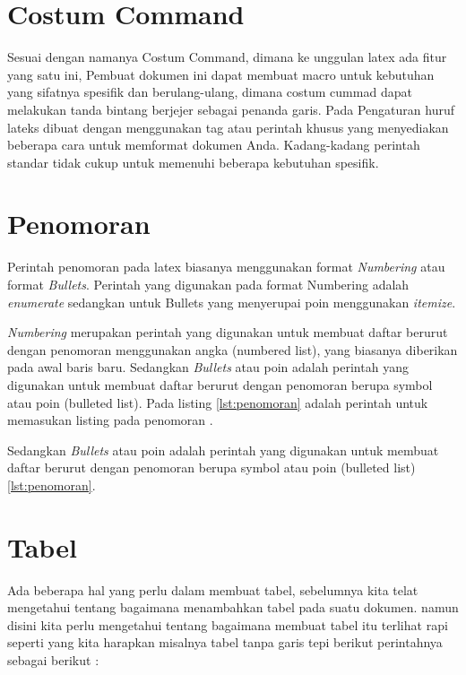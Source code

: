 \section{Costum Command}
Sesuai  dengan  namanya Costum Command, dimana ke unggulan latex ada fitur yang satu ini, Pembuat dokumen ini dapat  membuat macro untuk kebutuhan yang sifatnya spesifik dan berulang-ulang, dimana costum cummad dapat melakukan tanda bintang berjejer sebagai penanda garis. Pada Pengaturan huruf lateks dibuat dengan menggunakan tag atau perintah khusus yang menyediakan beberapa cara untuk memformat dokumen Anda. Kadang-kadang perintah standar tidak cukup untuk memenuhi beberapa kebutuhan spesifik.

\section{Penomoran}
Perintah penomoran pada latex biasanya menggunakan format \textit{Numbering} atau format \textit{Bullets}. Perintah yang digunakan pada format Numbering adalah \textit{enumerate} sedangkan untuk Bullets yang menyerupai poin menggunakan \textit{itemize}.



\textit{Numbering} merupakan perintah yang digunakan untuk membuat daftar berurut dengan penomoran menggunakan angka (numbered list), yang biasanya diberikan pada awal baris baru. Sedangkan \textit{Bullets} atau poin adalah perintah yang digunakan untuk membuat daftar berurut dengan penomoran berupa symbol atau poin (bulleted list). Pada listing \ref{lst:penomoran} adalah perintah untuk memasukan listing pada penomoran .



Sedangkan \textit{Bullets} atau poin adalah perintah yang digunakan untuk membuat daftar berurut dengan penomoran berupa symbol atau poin (bulleted list) \ref{lst:penomoran}.


\section {Tabel}
Ada beberapa hal yang perlu dalam membuat tabel, sebelumnya kita telat  mengetahui tentang bagaimana menambahkan tabel pada suatu dokumen. namun disini kita perlu mengetahui tentang bagaimana membuat tabel itu terlihat rapi seperti yang kita harapkan misalnya tabel tanpa garis tepi  berikut perintahnya sebagai berikut :


